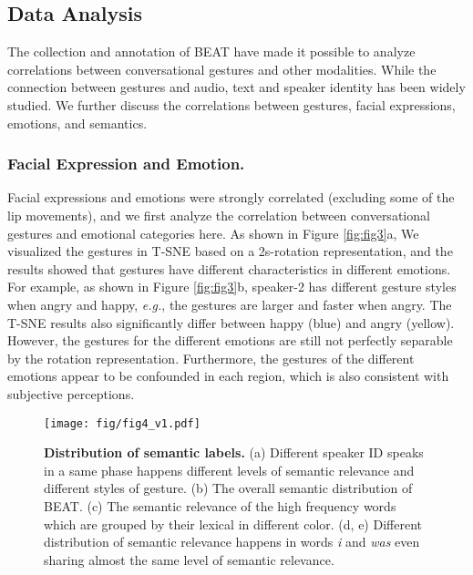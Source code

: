 \documentclass[runningheads]{llncs}
\begin{document}
\subsection{Data Analysis}
The collection and annotation of BEAT have made it possible to analyze correlations between conversational gestures and other modalities. While the connection between gestures and audio, text and speaker identity has been widely studied. We further discuss the correlations between gestures, facial expressions, emotions, and semantics.

\vspace{-0.5cm}

\subsubsection{Facial Expression and Emotion.} 
Facial expressions and emotions were strongly correlated (excluding some of the lip movements), and we first analyze the correlation between conversational gestures and emotional categories here. As shown in Figure \ref{fig:fig3}a, We visualized the gestures in T-SNE based on a 2s-rotation representation, and the results showed that gestures have different characteristics in different emotions. For example, as shown in Figure \ref{fig:fig3}b, speaker-2 has different gesture styles when angry and happy, \textit{e.g.}, the gestures are larger and faster when angry. The T-SNE results also significantly differ between happy (blue) and angry (yellow). However, the gestures for the different emotions are still not perfectly separable by the rotation representation. Furthermore, the gestures of the different emotions appear to be confounded in each region, which is also consistent with subjective perceptions.

\vspace{-0.5cm}

\begin{figure*}[]
    \centering
    \texttt{[image: fig/fig4\_v1.pdf]}
    
    \caption{\textbf{Distribution of semantic labels.} (a) Different speaker ID speaks in a same phase happens different levels of semantic relevance and different styles of gesture. (b) The overall semantic distribution of BEAT. (c) The semantic relevance of the high frequency words which are grouped by their lexical in different color. (d, e) Different distribution of semantic relevance happens in words \textit{i} and \textit{was} even sharing almost the same level of semantic relevance.}
    \vspace{-0.6cm}
    \label{fig:fig4}
\end{figure*} 
\end{document}
